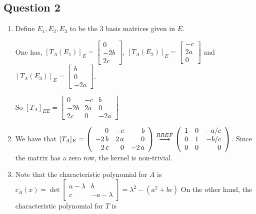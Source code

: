 \documentclass{article}
\newcommand{\grstep}[2][\relax]{%
   \ensuremath{\mathrel{
       {\mathop{\longrightarrow}\limits^{#2\mathstrut}_{
                                     \begin{subarray}{l} #1 \end{subarray}}}}}}
\begin{document}
\subsection*{Question 2}
\begin{enumerate}[label=(\alph*)]
    \item Define $E_1, E_2, E_3$ to be the 3 basis matrices given in $E$.

One has, $[T_A(E_1)]_E = 
    \begin{bmatrix} 
    0 \\
    -2b \\
    2c
    \end{bmatrix}$, $[T_A(E_2)]_E = 
    \begin{bmatrix} 
    -c \\
    2a \\
    0
    \end{bmatrix}$ and $[T_A(E_3)]_E = 
    \begin{bmatrix} 
    b \\
    0 \\
    -2a
    \end{bmatrix}$. 
    
    So $[T_A]_{EE}=
    \begin{bmatrix} 
    0 & -c & b\\
    -2b & 2a & 0\\
    2c & 0 & -2a
    \end{bmatrix}$
    \item We have that $[T_A]_{E}=\left(\begin{array}{rrr}
    0 & -c & b \\
    -2 \, b & 2 \, a & 0 \\
    2 \, c & 0 & -2 \, a
    \end{array}\right) \grstep[]{RREF} \left(\begin{array}{rrr}
    1 & 0 & -a/c \\
    0 & 1 & -b/c \\
    0 & 0 & 0
    \end{array}\right)$.
    Since the matrix has a zero row, the kernel is non-trivial.
    \item Note that the characteristic polynomial for $A$ is $c_A(x)=\det\begin{bmatrix} 
    a-\lambda & b \\
    c & -a-\lambda
    \end{bmatrix}=\lambda^2 - (a^2+bc)$
    On the other hand, the characteristic polynomial for $T$ is
    

\end{enumerate}
\end{document}
